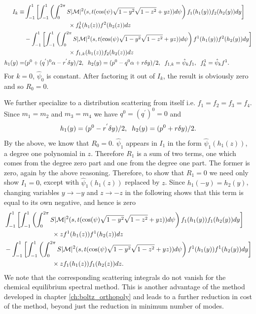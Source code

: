 {\small
\begin{align}
I_k\equiv&\int_{-1}^1 \left[\int_{-1}^1\left(\int_0^{2\pi}S|\mathcal{M}|^2 (s,t(\cos(\psi)\sqrt{1-y^2}\sqrt{1-z^2}+yz))d\psi\right) f_1(h_1(y))f_2(h_2(y)) dy\right] \notag\\
&\hspace{26mm}\times f_k^1(h_1(z))f^2(h_2(z))dz\\
&-\int_{-1}^1 \left[\int_{-1}^1\left(\int_0^{2\pi}S|\mathcal{M}|^2 (s,t(\cos(\psi)\sqrt{1-y^2}\sqrt{1-z^2}+yz))d\psi\right) f^1(h_1(y))f^2(h_2(y)) dy\right] \notag\\
&\hspace{26mm}\times f_{1,k}(h_1(z))f_2(h_2(z))dz\\
h_1(y)=&(p^0+(q^{'})^0\alpha-r^{'}\delta y)/2,\hspace{2mm} h_2(y)=(p^0-q^0\alpha+r\delta y)/2, \hspace{2mm} f_{1,k}=\hat\psi_k f_1,\hspace{2mm} f^1_k=\hat\psi_k f^1.
\end{align}
}
For $k=0$, $\hat\psi_0$ is constant.  After factoring it out of $I_k$, the result is obviously zero and so $R_0=0$.  

We further specialize to a distribution scattering from itself i.e. $f_1=f_2=f_3=f_4$.  Since $m_1=m_2$ and $m_3=m_4$ we have $q^0=(q^{'})^0=0$ and
\begin{equation}
h_1(y)=(p^0-r^{'}\delta y)/2,\hspace{2mm} h_2(y)=(p^0+r\delta y)/2.
\end{equation}
 By the above, we know that $R_0=0$.  $\hat\psi_1$ appears in $I_1$ in the form $\hat\psi_1(h_1(z))$, a degree one polynomial in $z$.  Therefore $R_1$ is a sum of two terms, one which comes from the degree zero part and one from the degree one part.  The former is zero, again by the above reasoning.  Therefore, to show that $R_1=0$ we need only show $I_1=0$, except with $\hat\psi_1(h_1(z))$ replaced by  $z$.  Since $h_1(-y)=h_2(y)$, changing variables  $y\rightarrow -y$ and $z\rightarrow -z$ in the following shows that this term is equal to its own negative, and hence is zero
\begin{align}
&\int_{-1}^1 \left[\int_{-1}^1\left(\int_0^{2\pi}S|\mathcal{M}|^2 (s,t(\cos(\psi)\sqrt{1-y^2}\sqrt{1-z^2}+yz))d\psi\right) f_1(h_1(y))f_1(h_2(y)) dy\right] \notag\\
&\hspace{26mm}\times  zf^1(h_1(z))f^1(h_2(z))dz\\
&-\int_{-1}^1 \left[\int_{-1}^1\left(\int_0^{2\pi}S|\mathcal{M}|^2 (s,t(\cos(\psi)\sqrt{1-y^2}\sqrt{1-z^2}+yz))d\psi\right) f^1(h_1(y))f^1(h_2(y)) dy\right] \notag\\
&\hspace{26mm}\times zf_{1}(h_1(z))f_1(h_2(z))dz.
\end{align}
We note that the corresponding scattering integrals do not vanish for the chemical equilibrium spectral method.  This is another advantage of the method developed in chapter \ref{ch:boltz_orthopoly} and leads to a further reduction in cost of the method, beyond just the reduction in minimum number of modes.

